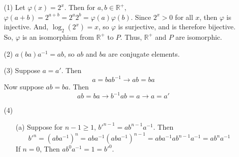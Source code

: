 %
%
\begin{itemize}
\item[(1)]
Let $\varphi(x) = 2^x$. Then for $a, b \in \mathbb{R}^+$, $\varphi(a + b) = 2^{a + b} = 2^a2^b = \varphi(a)\varphi(b)$. Since $2^x > 0$ for all $x$, then $\varphi$ is injective. And, $\log_2(2^x) = x$, so $\varphi$ is surjective, and is therefore bijective. So, $\varphi$ is an isomorphism from $\mathbb{R}^+$ to $P$. Thus, $\mathbb{R}^+$ and $P$ are isomorphic.
\item[(2)]
$a(ba)a^{-1} = ab$, so $ab$ and $ba$ are conjugate elements.
\item[(3)]
Suppose $a = a'$. Then
$$a = bab^{-1} \rightarrow ab = ba$$
Now suppose $ab = ba$. Then
$$ab = ba \rightarrow b^{-1}ab = a \rightarrow a = a'$$
\item[(4)]
\begin{itemize}
\item[(a)]
Suppose for $n - 1 \geq 1$, $b'^{n-1} = ab^{n-1}a^{-1}$. Then 
$$b'^n = (aba^{-1})^n = aba^{-1}(aba^{-1})^{n-1} = aba^{-1}ab^{n-1}a^{-1} = ab^na^{-1}$$
If $n = 0$, Then $ab^0a^{-1} = 1 = b'^0$.


\end{itemize}
\end{itemize}
